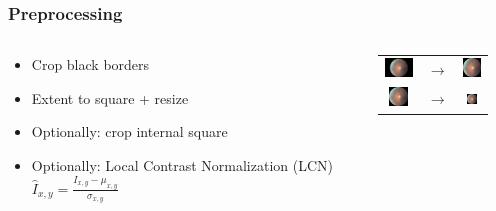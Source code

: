 \begin{frame}\frametitle{Preprocessing}
\begin{columns}

\begin{column}{9cm}
\begin{itemize}
\item Crop black borders
\vspace{20pt}

\item Extent to square + resize
\vspace{20pt}

\item Optionally: crop internal square
\vspace{20pt}

\item Optionally: Local Contrast Normalization (LCN) \\ 
      $ \hat{I}_{x,y} = \frac{I_{x,y} - \mu_{x,y}}{\sigma_{x,y}} $
\end{itemize}
\end{column}

\begin{column}{6cm}
\begin{tabular}{ @{}c m{0.25cm} c }

	\includegraphics[valign=c,height=0.5cm]{pics/10_left.jpeg} & $\rightarrow$ &
    \includegraphics[valign=c,height=0.5cm]{pics/10_left.png}
    \vspace{10pt} \\ 
    
	\includegraphics[valign=c,height=0.5cm]{pics/10_left.png} & $\rightarrow$ &
    \includegraphics[valign=c,height=0.25cm]{pics/10_left.png}
	\vspace{10pt} \\ 	


\end{tabular}
\end{column}
\end{columns}
\end{frame}
